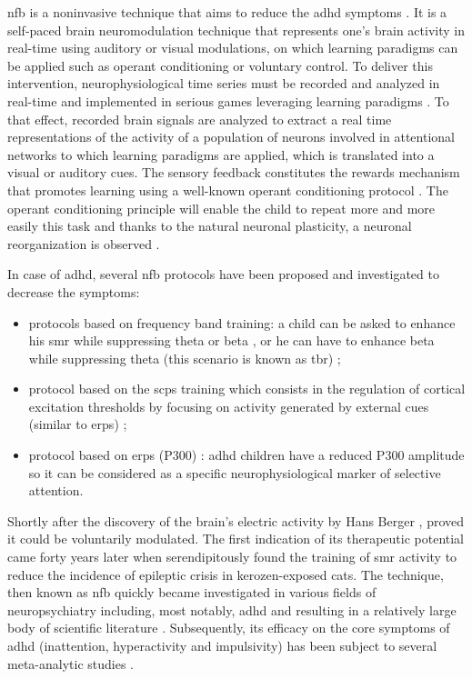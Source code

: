 \gls{nfb} is a noninvasive technique that aims to reduce the \gls{adhd} symptoms \citep{Arns2015, Steffert2010}.
It is a self-paced brain neuromodulation technique that represents one's brain activity in real-time using auditory or 
visual modulations, on which learning paradigms can be applied such as operant conditioning \citep{Reynolds1975} or voluntary control.
To deliver this intervention, neurophysiological time series must be recorded and analyzed in real-time and implemented in serious games 
leveraging learning paradigms \citep{Wang2010}. To that effect, recorded brain signals are analyzed to extract a real time representations of the activity 
of a population of neurons involved in attentional networks to which learning paradigms are applied, which is translated into a visual 
or auditory cues. The sensory feedback constitutes the rewards mechanism that promotes learning using a well-known operant conditioning protocol \citep{Sherlin2011}. 
The operant conditioning principle will enable the child to repeat more and more easily this task and thanks to the natural neuronal plasticity,
a neuronal reorganization is observed \citep{VanDoren2017}. 

In case of \gls{adhd}, several \gls{nfb} protocols have been proposed and investigated to decrease the symptoms: 
\begin{itemize}
	\item protocols based on frequency band training: a child can be asked to enhance his \gls{smr} 
	while suppressing theta or beta \citep{Lubar1976}, or he can have to enhance beta
	while suppressing theta (this scenario is known as \gls{tbr}) \citep{Arns2013};
	\item protocol based on the \glspl{scp} training which consists in the regulation of cortical excitation 
	thresholds by focusing on activity generated by external cues 
	(similar to \glspl{erp}) \citep{Heinrich2004, Banaschewski2007}; 
	\item protocol based on \glspl{erp} (P300) \citep{Fouillen2017}: \gls{adhd} children have a reduced P300 
	amplitude so it can be considered as a specific neurophysiological marker of selective attention. 
\end{itemize} 

Shortly after the discovery of the brain's electric activity by Hans Berger \citet{Berger1929}, \citet{Durup1935} proved it could be voluntarily modulated. 
The first indication of its therapeutic potential came forty years later when \citet{Sterman1974} serendipitously found the training of \gls{smr} 
activity to reduce the incidence of epileptic crisis in kerozen-exposed cats. The technique, then known as \gls{nfb} quickly became investigated in 
various fields of neuropsychiatry including, most notably, \gls{adhd} and resulting in a relatively large body of scientific literature 
\citep{Lubar1976, Rossiter1995, Linden1996, Maurizio2014}. Subsequently, its efficacy on the core symptoms of \gls{adhd} (inattention, hyperactivity 
and impulsivity) has been subject to several meta-analytic studies \citep{Loo2005, Lofthouse2012, Arns2009, Micoulaud2014, Sonuga-Barke2013}. 

